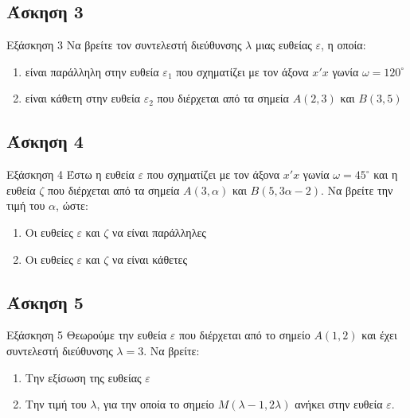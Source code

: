 \documentclass[greek]{beamer}
\begin{document}
\subsection{Άσκηση 3}
\begin{frame}[label=Άσκηση3]{Εξάσκηση 3}
 Να βρείτε τον συντελεστή διεύθυνσης $λ$ μιας ευθείας $ε$, η οποία:
 \begin{enumerate}
  \item<1-> είναι παράλληλη στην ευθεία $ε_1$ που σχηματίζει με τον άξονα $x'x$ γωνία $ω=120^{\circ}$
  \item<2-> είναι κάθετη στην ευθεία $ε_2$ που διέρχεται από τα σημεία $Α(2,3)$ και $Β(3,5)$
 \end{enumerate}

\end{frame}

\subsection{Άσκηση 4}
\begin{frame}[label=Άσκηση4]{Εξάσκηση 4}
 Έστω η ευθεία $ε$ που σχηματίζει με τον άξονα $x'x$ γωνία $ω=45^{\circ}$ και η ευθεία $ζ$ που διέρχεται από τα σημεία $Α(3,α)$ και $Β(5,3α-2)$. Να βρείτε την τιμή του $α$, ώστε:
 \begin{enumerate}
  \item<1-> Οι ευθείες $ε$ και $ζ$ να είναι παράλληλες
  \item<2-> Οι ευθείες $ε$ και $ζ$ να είναι κάθετες
 \end{enumerate}

\end{frame}

\subsection{Άσκηση 5}
\begin{frame}[label=Άσκηση5]{Εξάσκηση 5}
 Θεωρούμε την ευθεία $ε$ που διέρχεται από το σημείο $Α(1,2)$ και έχει συντελεστή διεύθυνσης $λ=3$. Να βρείτε:
 \begin{enumerate}
  \item<1-> Την εξίσωση της ευθείας $ε$
  \item<2-> Την τιμή του $λ$, για την οποία το σημείο $Μ(λ-1,2λ)$ ανήκει στην ευθεία $ε$.
 \end{enumerate}

\end{frame}
\end{document}
